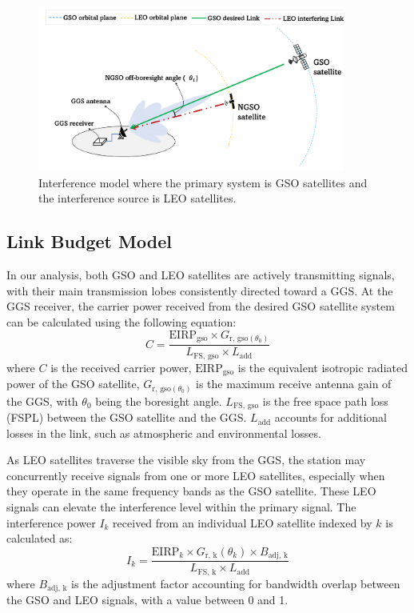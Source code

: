 \documentclass[12pt]{article}
\begin{document}
\begin{figure}[htbp]
    \centering
    \includegraphics[width=0.9\textwidth]{ngso-gso-interference.png}
    \caption{Interference model where the primary system is GSO satellites and the interference source is LEO satellites.}
    \label{fig:interference-scenario}
\end{figure}

\subsection{Link Budget Model}

In our analysis, both GSO and LEO satellites are actively transmitting signals, with their main transmission lobes consistently directed toward a GGS. At the GGS receiver, the carrier power received from the desired GSO satellite system can be calculated using the following equation:
$$
    C = \frac{\text{EIRP}_{\text{gso}} \times G_{\text{r, gso}(\theta_0)}}{L_{\text{FS, gso}} \times  L_{\text{add}}}
$$
where $C $ is the received carrier power, $\text{EIRP}_{\text{gso}}$ is the equivalent isotropic radiated power of the GSO satellite, $G_{\text{r, gso}(\theta_0)}$ is the maximum receive antenna gain of the GGS, with $\theta_0$ being the boresight angle. $L_{\text{FS, gso}}$ is the free space path loss (FSPL) between the GSO satellite and the GGS. $L_{\text{add}}$ accounts for additional losses in the link, such as atmospheric and environmental losses.

As LEO satellites traverse the visible sky from the GGS, the station may concurrently receive signals from one or more LEO satellites, especially when they operate in the same frequency bands as the GSO satellite. These LEO signals can elevate the interference level within the primary signal. The interference power $I_k$ received from an individual LEO satellite indexed by $k$ is calculated as:
$$
    I_k = \frac{\text{EIRP}_{k} \times G_{\text{r, k}}(\theta_k) \times B_{\text{adj, k}}}{L_{\text{FS, k} }\times  L_{\text{add}}}
$$
where $B_{\text{adj, k}}$ is the adjustment factor accounting for bandwidth overlap between the GSO and LEO signals, with a value between 0 and 1.
\end{document}
